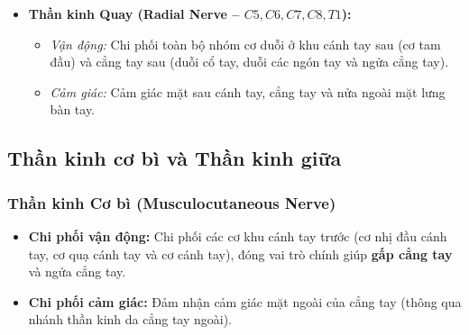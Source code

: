 \begin{itemize}
    \item \textbf{Thần kinh Quay (Radial Nerve -- $C5, C6, C7, C8, T1$):}
    \begin{itemize}
        \item \textit{Vận động:} Chi phối toàn bộ nhóm cơ duỗi ở khu cánh tay sau (cơ tam đầu) và cẳng tay sau (duỗi cổ tay, duỗi các ngón tay và ngửa cẳng tay).
        \item \textit{Cảm giác:} Cảm giác mặt sau cánh tay, cẳng tay và nửa ngoài mặt lưng bàn tay.
    \end{itemize}
\end{itemize}

\subsection{Thần kinh cơ bì và Thần kinh giữa}

\subsubsection{Thần kinh Cơ bì (Musculocutaneous Nerve)}
\begin{itemize}
    \item \textbf{Chi phối vận động:} Chi phối các cơ khu cánh tay trước (cơ nhị đầu cánh tay, cơ quạ cánh tay và cơ cánh tay), đóng vai trò chính giúp \textbf{gấp cẳng tay} và ngửa cẳng tay.
    \item \textbf{Chi phối cảm giác:} Đảm nhận cảm giác mặt ngoài của cẳng tay (thông qua nhánh thần kinh da cẳng tay ngoài).
\end{itemize}

